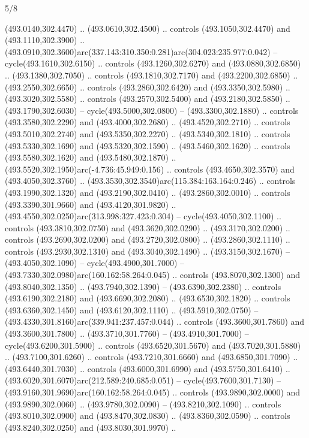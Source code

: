 \begin{flagdescription}{5/8}
\begin{scope}[xshift=0.5\flaglength,yshift=0.5\flagwidth,scale=\flagwidth/475.63]
\begin{scope}[y=0.8pt, x=0.8pt, yscale=-1, xscale=1,shift={(-450,-300)}]
\begin{scope}[cm={{1.0,0.0,0.0,1.0,(-0.0002,0.12556)}},cm={{1.0,0.0,0.0,1.0,(0.00179,0.0)}}]
\begin{scope}[cm={{1.11592,0.0,0.0,1.11592,(-106.89933,-41.77764)}}]
\begin{scope}[draw=black,fill=cfff]
\begin{scope}[fill=black]
  (493.0140,302.4470) .. (493.0610,302.4500) .. controls (493.1050,302.4470) and
  (493.1110,302.3900) ..
  (493.0910,302.3600)arc(337.143:310.350:0.281)arc(304.023:235.977:0.042) --
  cycle(493.1610,302.6150) .. controls (493.1260,302.6270) and
  (493.0880,302.6850) .. (493.1380,302.7050) .. controls (493.1810,302.7170) and
  (493.2200,302.6850) .. (493.2550,302.6650) .. controls (493.2860,302.6420) and
  (493.3350,302.5980) .. (493.3020,302.5580) .. controls (493.2570,302.5400) and
  (493.2180,302.5850) .. (493.1790,302.6030) -- cycle(493.5000,302.0800) --
  (493.3300,302.1880) .. controls (493.3580,302.2290) and (493.4000,302.2680) ..
  (493.4520,302.2710) .. controls (493.5010,302.2740) and (493.5350,302.2270) ..
  (493.5340,302.1810) .. controls (493.5330,302.1690) and (493.5320,302.1590) ..
  (493.5460,302.1620) .. controls (493.5580,302.1620) and (493.5480,302.1870) ..
  (493.5520,302.1950)arc(-4.736:45.949:0.156) .. controls (493.4650,302.3570)
  and (493.4050,302.3760) .. (493.3530,302.3540)arc(115.384:163.164:0.246) ..
  controls (493.1990,302.1320) and (493.2190,302.0410) .. (493.2860,302.0010) ..
  controls (493.3390,301.9660) and (493.4120,301.9820) ..
  (493.4550,302.0250)arc(313.998:327.423:0.304) -- cycle(493.4050,302.1100) ..
  controls (493.3810,302.0750) and (493.3620,302.0290) .. (493.3170,302.0200) ..
  controls (493.2690,302.0200) and (493.2720,302.0800) .. (493.2860,302.1110) ..
  controls (493.2930,302.1310) and (493.3040,302.1490) .. (493.3150,302.1670) --
  (493.4050,302.1090) -- cycle(493.4900,301.7000) --
  (493.7330,302.0980)arc(160.162:58.264:0.045) .. controls (493.8070,302.1300)
  and (493.8040,302.1350) .. (493.7940,302.1390) -- (493.6390,302.2380) ..
  controls (493.6190,302.2180) and (493.6690,302.2080) .. (493.6530,302.1820) ..
  controls (493.6360,302.1450) and (493.6120,302.1110) .. (493.5910,302.0750) --
  (493.4330,301.8160)arc(339.941:237.457:0.044) .. controls (493.3600,301.7860)
  and (493.3600,301.7800) .. (493.3710,301.7760) -- (493.4910,301.7000) --
  cycle(493.6200,301.5900) .. controls (493.6520,301.5670) and
  (493.7020,301.5880) .. (493.7100,301.6260) .. controls (493.7210,301.6660) and
  (493.6850,301.7090) .. (493.6440,301.7030) .. controls (493.6000,301.6990) and
  (493.5750,301.6410) .. (493.6020,301.6070)arc(212.589:240.685:0.051) --
  cycle(493.7600,301.7130) -- (493.9160,301.9690)arc(160.162:58.264:0.045) ..
  controls (493.9890,302.0000) and (493.9890,302.0060) .. (493.9780,302.0090) --
  (493.8210,302.1090) .. controls (493.8010,302.0900) and (493.8470,302.0830) ..
  (493.8360,302.0590) .. controls (493.8240,302.0250) and (493.8030,301.9970) ..

\end{scope}
\end{scope}
\end{scope}
\end{scope}
\end{scope}
\end{scope}
\end{flagdescription}
